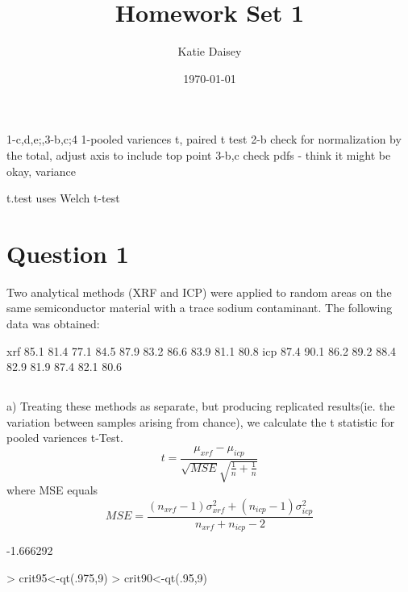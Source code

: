 \documentclass[12pt,letterpaper]{article}
\author{Katie Daisey}
\title{Homework Set 1}
\date{\today}
\begin{document}

\maketitle



1-c,d,e;,3-b,c;4
1-pooled variences t, paired t test
2-b check for normalization by the total, adjust axis to include top point
3-b,c check pdfs - think it might be okay, variance

t.test uses Welch t-test

\section*{Question 1}

Two analytical methods (XRF and ICP) were applied to random areas on the same semiconductor material with a trace sodium contaminant.  The following data was obtained:
\begin{Schunk}
\begin{Soutput}
    [,1] [,2] [,3] [,4] [,5] [,6] [,7] [,8] [,9] [,10]
xrf 85.1 81.4 77.1 84.5 87.9 83.2 86.6 83.9 81.1  80.8
icp 87.4 90.1 86.2 89.2 88.4 82.9 81.9 87.4 82.1  80.6
\end{Soutput}
\end{Schunk}
\subsection*{}
a) Treating these methods as separate, but producing replicated results(ie. the variation between samples arising from chance), we calculate the t statistic for pooled variences t-Test.
\begin{equation}
t=\frac{\mu _{xrf}-\mu _{icp}}{\sqrt{MSE}\sqrt{\frac{1}{n}+\frac{1}{n}}}
\end{equation}
where MSE equals
\begin{equation}
MSE=\frac{(n_{xrf} -1)\sigma _{xrf}^{2}+(n_{icp}-1)\sigma _{icp} ^{2}}{n_{xrf}+n_{icp}-2}
\end{equation}

\begin{Schunk}
\begin{Soutput}
[1] -1.666292
\end{Soutput}
\end{Schunk}


\begin{Schunk}
\begin{Sinput}
> crit95<-qt(.975,9)
> crit90<-qt(.95,9)
\end{Sinput}
\end{Schunk}
\end{document}
